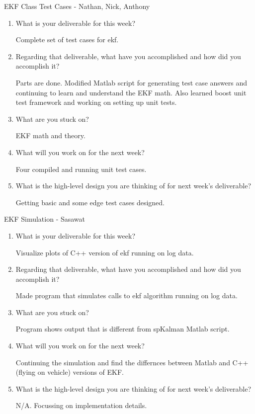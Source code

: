 \documentclass{article}
\begin{document}
\noindent{}EKF Class Test Cases - Nathan, Nick, Anthony
\begin{enumerate}
    \item What is your deliverable for this week?

    Complete set of test cases for ekf.

    \item Regarding that deliverable, what have you accomplished and how did
        you accomplish it?

    Parts are done. Modified Matlab script for generating test case answers 
    and continuing to learn and understand the 
    EKF math. Also learned boost unit test framework and working on setting up 
    unit tests.

    \item What are you stuck on?

    EKF math and theory.

    \item What will you work on for the next week?
    
    Four compiled and running unit test cases.

    \item What is the high-level design you are thinking of for next week's
        deliverable?
    
    Getting basic and some edge test cases designed.
\end{enumerate}


\noindent{}EKF Simulation - Sasawat
\begin{enumerate}
    \item What is your deliverable for this week?

    Visualize plots of C++ version of ekf running on log data.

    \item Regarding that deliverable, what have you accomplished and how did
        you accomplish it?

    Made program that simulates calls to ekf algorithm running on log data.

    \item What are you stuck on?

    Program shows output that is different from spKalman Matlab script.

    \item What will you work on for the next week?
    
    Continuing the simulation and find the differnces between Matlab and C++
    (flying on vehicle) versions of EKF.

    \item What is the high-level design you are thinking of for next week's
        deliverable?
    
    N/A. Focussing on implementation details.
\end{enumerate}
\end{document}
